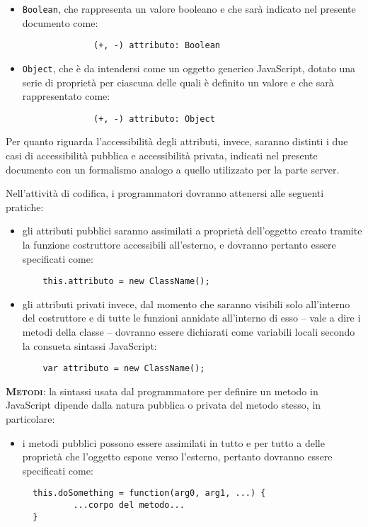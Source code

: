 \begin{description}
\begin{itemize}
			\item \texttt{Boolean}, che rappresenta un valore booleano e che sarà indicato nel presente documento come:
			\begin{verbatim}
			  (+, -) attributo: Boolean
			\end{verbatim}
			
			\item \texttt{Object}, che è da intendersi come un oggetto generico JavaScript, dotato una serie di proprietà per ciascuna delle quali è definito un valore e che sarà rappresentato come:
			\begin{verbatim}
			  (+, -) attributo: Object
			\end{verbatim}
	\end{itemize}
		
Per quanto riguarda l'accessibilità degli attributi, invece, saranno distinti i due casi di accessibilità pubblica e accessibilità privata, indicati nel presente documento con un formalismo analogo a quello utilizzato per la parte server.

Nell'attività di codifica, i programmatori dovranno attenersi alle seguenti pratiche:
\begin{itemize}
  \item gli attributi pubblici saranno assimilati a proprietà dell'oggetto creato tramite la funzione costruttore accessibili all'esterno, e dovranno pertanto essere specificati come:
  \begin{verbatim}
    this.attributo = new ClassName();
  \end{verbatim}
  
  \item gli attributi privati invece, dal momento che saranno visibili solo all'interno del costruttore e di tutte le funzioni annidate all'interno di esso -- vale a dire i metodi della classe -- dovranno essere dichiarati come variabili locali secondo la consueta sintassi JavaScript:
  \begin{verbatim}
    var attributo = new ClassName();
  \end{verbatim}
\end{itemize}
		
	\item{\scshape\bfseries Metodi}: la sintassi usata dal programmatore per definire un metodo in JavaScript dipende dalla natura pubblica o privata del metodo stesso, in particolare:
	\begin{itemize}
	
\item i metodi pubblici possono essere assimilati in tutto e per tutto a delle proprietà che l'oggetto espone verso l'esterno, pertanto dovranno essere specificati come:
\begin{verbatim}
  this.doSomething = function(arg0, arg1, ...) {
          ...corpo del metodo...
  }
\end{verbatim}


\end{itemize}
\end{description}
